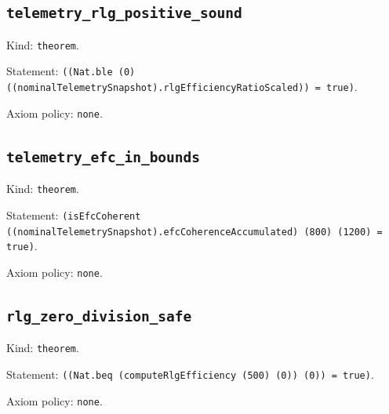 \documentclass[11pt]{article}
\begin{document}
\subsection*{\texttt{telemetry\_rlg\_positive\_sound}}
\noindent Kind: \texttt{theorem}.\par
\noindent Statement: \texttt{((Nat.ble (0) ((nominalTelemetrySnapshot).rlgEfficiencyRatioScaled)) = true)}.\par
\noindent Axiom policy: \texttt{none}.\par
\subsection*{\texttt{telemetry\_efc\_in\_bounds}}
\noindent Kind: \texttt{theorem}.\par
\noindent Statement: \texttt{(isEfcCoherent ((nominalTelemetrySnapshot).efcCoherenceAccumulated) (800) (1200) = true)}.\par
\noindent Axiom policy: \texttt{none}.\par
\subsection*{\texttt{rlg\_zero\_division\_safe}}
\noindent Kind: \texttt{theorem}.\par
\noindent Statement: \texttt{((Nat.beq (computeRlgEfficiency (500) (0)) (0)) = true)}.\par
\noindent Axiom policy: \texttt{none}.\par
\end{document}

